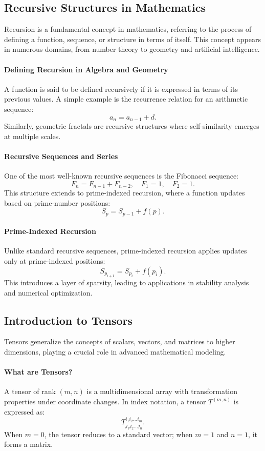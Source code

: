 \documentclass{article}
\theoremstyle{plain}
\begin{document}
\subsection{Recursive Structures in Mathematics}

Recursion is a fundamental concept in mathematics, referring to the process of defining a function, sequence, or structure in terms of itself. This concept appears in numerous domains, from number theory to geometry and artificial intelligence.

\paragraph{Defining Recursion in Algebra and Geometry}
A function is said to be defined recursively if it is expressed in terms of its previous values. A simple example is the recurrence relation for an arithmetic sequence:
\[
a_n = a_{n-1} + d.
\]
Similarly, geometric fractals are recursive structures where self-similarity emerges at multiple scales.

\paragraph{Recursive Sequences and Series}
One of the most well-known recursive sequences is the Fibonacci sequence:
\[
F_n = F_{n-1} + F_{n-2}, \quad F_1 = 1, \quad F_2 = 1.
\]
This structure extends to prime-indexed recursion, where a function updates based on prime-number positions:
\[
S_p = S_{p-1} + f(p).
\]

\paragraph{Prime-Indexed Recursion}
Unlike standard recursive sequences, prime-indexed recursion applies updates only at prime-indexed positions:
\[
S_{p_{i+1}} = S_{p_i} + f(p_i).
\]
This introduces a layer of sparsity, leading to applications in stability analysis and numerical optimization.

\subsection{Introduction to Tensors}

Tensors generalize the concepts of scalars, vectors, and matrices to higher dimensions, playing a crucial role in advanced mathematical modeling.

\paragraph{What are Tensors?}
A tensor of rank \( (m, n) \) is a multidimensional array with transformation properties under coordinate changes. In index notation, a tensor \( T^{(m,n)} \) is expressed as:
\[
T^{i_1 i_2 \dots i_m}_{j_1 j_2 \dots j_n}.
\]
When \( m = 0 \), the tensor reduces to a standard vector; when \( m = 1 \) and \( n = 1 \), it forms a matrix.
\end{document}
